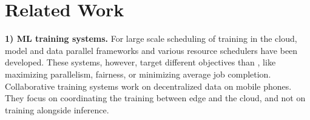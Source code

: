 
\section{Related Work}
\label{sec:related_work}


















\noindent\textbf{1) ML training systems.} %
For large scale scheduling of training in the cloud, model and data parallel frameworks \cite{DBLP:conf/nips/DeanCMCDLMRSTYN12, DBLP:journals/pvldb/LowGKBGH12, 199317, mxnet} %
and various resource schedulers \cite{themis, DBLP:conf/osdi/XiaoBRSKHPPZZYZ18, DBLP:conf/nsdi/GuCSZJQLG19, optimus, DBLP:conf/sigcomm/GrandlAKRA14, DBLP:conf/cloud/ZhangSOF17} %
have been developed. These systems, however, target different objectives than {\name}, like maximizing parallelism, fairness, or minimizing average job completion. %
Collaborative training systems \cite{DBLP:journals/corr/abs-1902-01046, DBLP:conf/edge/LuSTLZCP19} work on decentralized data on mobile phones. They focus on coordinating the training between edge and the cloud, and not on training alongside inference.

